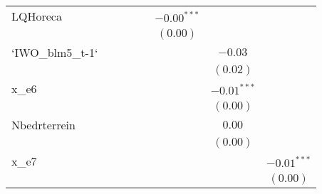 \begin{center}
\begin{longtable}{l c c c c c c c }
LQHoreca         &               &             &              &               & $-0.00^{***}$ &               &               \\
                 &               &             &              &               & $(0.00)$      &               &               \\
`IWO\_blm5\_t-1` &               &             &              &               &               & $-0.03$       &               \\
                 &               &             &              &               &               & $(0.02)$      &               \\
x\_e6            &               &             &              &               &               & $-0.01^{***}$ &               \\
                 &               &             &              &               &               & $(0.00)$      &               \\
Nbedrterrein     &               &             &              &               &               & $0.00$        &               \\
                 &               &             &              &               &               & $(0.00)$      &               \\
x\_e7            &               &             &              &               &               &               & $-0.01^{***}$ \\
                 &               &             &              &               &               &               & $(0.00)$      \\
\end{longtable}
\end{center}
